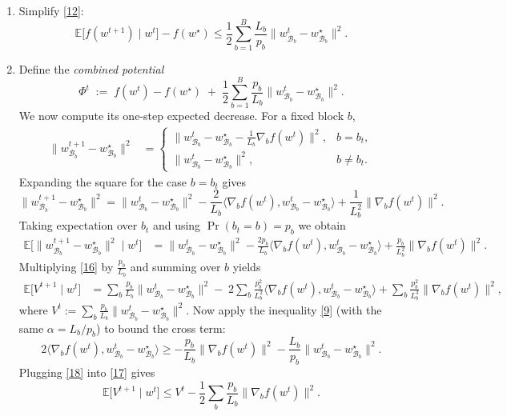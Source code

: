 \documentclass[11pt]{article}
\newcommand{\E}{\mathbb{E}}
\begin{document}
\begin{enumerate}[label=[Step \arabic*],leftmargin=*]
\item %
Simplify \eqref{12}:
\[
\E\!\bigl[f(w^{t+1})\mid w^{t}\bigr]-f(w^{\star})
\le
\frac12\sum_{b=1}^{B}\frac{L_{b}}{p_{b}}
\|w^{t}_{\mathcal{B}_{b}}-w^{\star}_{\mathcal{B}_{b}}\|^{2}.
\tag{13}
\]

\item %
Define the \emph{combined potential}
\[
\Phi^{t}\;:=\;f(w^{t})-f(w^{\star})
\;+\;\frac12\sum_{b=1}^{B}\frac{p_{b}}{L_{b}}
\|w^{t}_{\mathcal{B}_{b}}-w^{\star}_{\mathcal{B}_{b}}\|^{2}.
\tag{14}
\]
We now compute its one‑step expected decrease.
For a fixed block $b$,
\[
\begin{aligned}
\|w^{t+1}_{\mathcal{B}_{b}}-w^{\star}_{\mathcal{B}_{b}}\|^{2}
&=
\begin{cases}
\|w^{t}_{\mathcal{B}_{b}}-w^{\star}_{\mathcal{B}_{b}}
-\frac{1}{L_{b}}\nabla_{b}f(w^{t})\|^{2},
& b=b_{t},\\[4pt]
\|w^{t}_{\mathcal{B}_{b}}-w^{\star}_{\mathcal{B}_{b}}\|^{2},
& b\neq b_{t}.
\end{cases}
\end{aligned}
\]
Expanding the square for the case $b=b_{t}$ gives
\[
\|w^{t+1}_{\mathcal{B}_{b}}-w^{\star}_{\mathcal{B}_{b}}\|^{2}
=
\|w^{t}_{\mathcal{B}_{b}}-w^{\star}_{\mathcal{B}_{b}}\|^{2}
-\frac{2}{L_{b}}\langle\nabla_{b}f(w^{t}),
w^{t}_{\mathcal{B}_{b}}-w^{\star}_{\mathcal{B}_{b}}\rangle
+\frac{1}{L_{b}^{2}}\|\nabla_{b}f(w^{t})\|^{2}.
\tag{15}
\]
Taking expectation over $b_{t}$ and using $\Pr(b_{t}=b)=p_{b}$ we obtain
\[
\begin{aligned}
\E\!\bigl[\|w^{t+1}_{\mathcal{B}_{b}}-w^{\star}_{\mathcal{B}_{b}}\|^{2}\mid w^{t}\bigr]
&=
\|w^{t}_{\mathcal{B}_{b}}-w^{\star}_{\mathcal{B}_{b}}\|^{2}
-\frac{2p_{b}}{L_{b}}\langle\nabla_{b}f(w^{t}),
w^{t}_{\mathcal{B}_{b}}-w^{\star}_{\mathcal{B}_{b}}\rangle
+\frac{p_{b}}{L_{b}^{2}}\|\nabla_{b}f(w^{t})\|^{2}.
\end{aligned}
\tag{16}
\]
Multiplying \eqref{16} by $\frac{p_{b}}{L_{b}}$ and summing over $b$ yields
\[
\begin{aligned}
\E\!\bigl[V^{t+1}\mid w^{t}\bigr]
&= \sum_{b}\frac{p_{b}}{L_{b}}
\|w^{t}_{\mathcal{B}_{b}}-w^{\star}_{\mathcal{B}_{b}}\|^{2}
-\;2\sum_{b}\frac{p_{b}^{2}}{L_{b}^{2}}
\langle\nabla_{b}f(w^{t}),w^{t}_{\mathcal{B}_{b}}-w^{\star}_{\mathcal{B}_{b}}\rangle
+\sum_{b}\frac{p_{b}^{2}}{L_{b}^{3}}\|\nabla_{b}f(w^{t})\|^{2},
\end{aligned}
\tag{17}
\]
where $V^{t}:=\sum_{b}\frac{p_{b}}{L_{b}}\|w^{t}_{\mathcal{B}_{b}}-w^{\star}_{\mathcal{B}_{b}}\|^{2}$.
Now apply the inequality \eqref{9} (with the same $\alpha=L_{b}/p_{b}$) to bound the
cross term:
\[
2\langle\nabla_{b}f(w^{t}),w^{t}_{\mathcal{B}_{b}}-w^{\star}_{\mathcal{B}_{b}}\rangle
\ge
-\frac{p_{b}}{L_{b}}\|\nabla_{b}f(w^{t})\|^{2}
-\frac{L_{b}}{p_{b}}\|w^{t}_{\mathcal{B}_{b}}-w^{\star}_{\mathcal{B}_{b}}\|^{2}.
\tag{18}
\]
Plugging \eqref{18} into \eqref{17} gives
\[
\E\!\bigl[V^{t+1}\mid w^{t}\bigr]
\le V^{t}
-\frac12\sum_{b}\frac{p_{b}}{L_{b}}\|\nabla_{b}f(w^{t})\|^{2}.
\tag{19}
\]


\end{enumerate}
\end{document}
